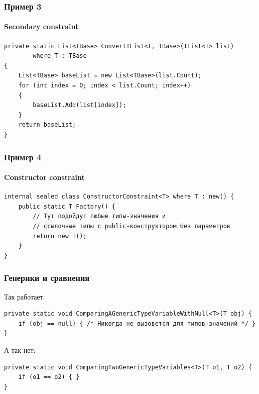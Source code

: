 \documentclass[xetex,mathserif,serif]{beamer}
\begin{document}
    \begin{frame}[fragile]
        \frametitle{Пример 3}
        \framesubtitle{Secondary constraint}
        \begin{footnotesize}
            \begin{verbatim}
private static List<TBase> ConvertIList<T, TBase>(IList<T> list)
        where T : TBase 
{
    List<TBase> baseList = new List<TBase>(list.Count);
    for (int index = 0; index < list.Count; index++) 
    {
        baseList.Add(list[index]);
    }
    return baseList;
}
            \end{verbatim}
        \end{footnotesize}
    \end{frame}

    \begin{frame}[fragile]
        \frametitle{Пример 4}
        \framesubtitle{Constructor constraint}
        \begin{footnotesize}
            \begin{verbatim}
internal sealed class ConstructorConstraint<T> where T : new() {
    public static T Factory() {
        // Тут подойдут любые типы-значения и 
        // ссылочные типы с public-конструктором без параметров
        return new T();
    }
}
            \end{verbatim}
        \end{footnotesize}
    \end{frame}

    \begin{frame}[fragile]
        \frametitle{Генерики и сравнения}
        Так работает:
        \begin{footnotesize}
            \begin{verbatim}
private static void ComparingAGenericTypeVariableWithNull<T>(T obj) {
    if (obj == null) { /* Никогда не вызовется для типов-значений */ }
}
            \end{verbatim}
        \end{footnotesize}
        \vspace{5mm}
        А так нет:
        \begin{footnotesize}
            \begin{verbatim}
private static void ComparingTwoGenericTypeVariables<T>(T o1, T o2) {
    if (o1 == o2) { }
}
            \end{verbatim}
        \end{footnotesize}
    \end{frame}
\end{document}
